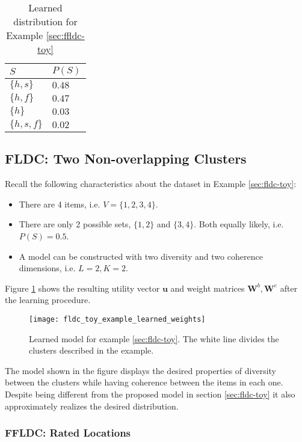 \begin{table}
  \centering
  \caption{Learned distribution for Example \ref{sec:ffldc-toy}}
  \begin{tabular}{@{}ll@{}}
    \toprule
    $S$ & $P(S)$\\
    \midrule
    $\{h,s\}$ & $0.48$ \\
    $\{h,f\}$ & $0.47$ \\
    $\{h\}$ & $0.03$ \\
    $\{h,s,f\}$ & $0.02$ \\
    \bottomrule
  \end{tabular}
  \label{tab:flid-toy-learned-probs}
\end{table}

\subsection{FLDC: Two Non-overlapping Clusters}

Recall the following characteristics about the dataset in Example \ref{sec:fldc-toy}:

\begin{itemize}
  \item There are 4 items, i.e. $V = \{1,2,3,4\}$.
  \item There are only 2 possible sets, $\{1,2\}$ and $\{3,4\}$. Both equally likely, i.e. $P(S) = 0.5$.
  \item A model can be constructed with two diversity and two coherence dimensions, i.e. $L=2,K=2$.
\end{itemize}

Figure \ref{fig:fldc-toy-learned-weights} shows the resulting utility vector $\mathbf{u}$ and weight matrices $\mathbf{W}^{b}, \mathbf{W}^{e}$ after the learning procedure.

\begin{figure}
  \centering
  \texttt{[image: fldc\_toy\_example\_learned\_weights]}
  \caption{Learned model for example \ref{sec:fldc-toy}. The white line divides the clusters described in the example.}
  \label{fig:fldc-toy-learned-weights}
\end{figure}

The model shown in the figure displays the desired properties of diversity between the clusters while having coherence between the items in each one. Despite being different from the proposed model in section \ref{sec:fldc-toy} it also approximately realizes the desired distribution.

\subsubsection{FFLDC: Rated Locations}

